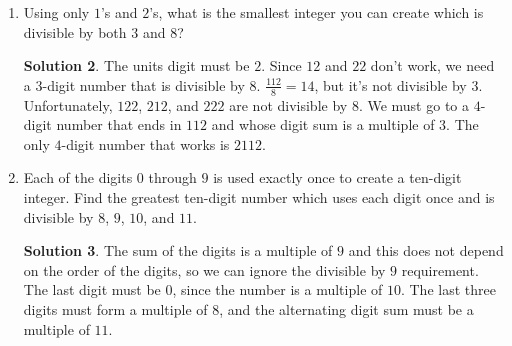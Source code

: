 \documentclass{article}
\DeclareMathOperator{\lcm}{lcm}
\theoremstyle{definition}
\newtheorem*{solution}{Solution}
\begin{document}
\begin{multicols}{2}
\begin{enumerate}
\begin{solution}
                The simplest solution is to use the fact that the multiples of all the listed
                numbers are just the multiples of the LCM of all of the numbers.
                To find $\lcm(2, 3, 4, 5, 6, 8, 9, 10)$, we can first ignore $2$, $3$, $4$, and $5$,
                since any multiple of $6$, $8$, $9$, and $10$ are multiples of $2$, $3$, $4$,
                and $5$.
                If we prime factorize $6$, $8$, $9$, and $10$, we see that a number that is
                a multiple of all of these must contain $2^3$, $3^2$, and $5$, so the LCM
                is $2^3 \cdot 3^2 \cdot 5 = 360$.
                Our answer is the smallest four-digit multiple of $360$, which is $\boxed{1080}$.
            \end{solution}
        \item Using only $1$'s and $2$'s, what is the smallest integer you can create which is
            divisible by both $3$ and $8$?
            \begin{solution}
                The units digit must be $2$.
                Since $12$ and $22$ don't work, we need a $3$-digit number that is divisible by $8$.
                $\frac{112}{8} = 14$, but it's not divisible by $3$.
                Unfortunately, $122$, $212$, and $222$ are not divisible by $8$.
                We must go to a $4$-digit number that ends in $112$ and whose digit sum is a
                multiple of $3$.
                The only $4$-digit number that works is $\boxed{2112}$.
            \end{solution}
        \item Each of the digits $0$ through $9$ is used exactly once to create a ten-digit integer.
            Find the greatest ten-digit number which uses each digit once and is divisible by $8$,
            $9$, $10$, and $11$.
            \begin{solution}
                The sum of the digits is a multiple of $9$ and this does not depend on the order
                of the digits, so we can ignore the divisible by $9$ requirement.
                The last digit must be $0$, since the number is a multiple of $10$.
                The last three digits must form a multiple of $8$, and the alternating digit sum
                must be a multiple of $11$.


\end{solution}
\end{enumerate}
\end{multicols}
\end{document}
